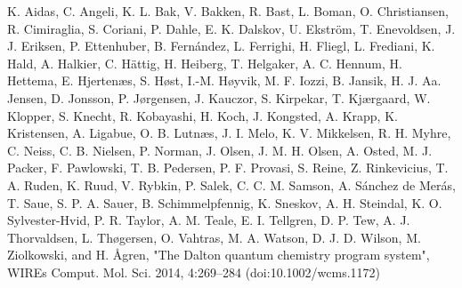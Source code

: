 \documentclass{article}
\begin{document}
\begin{thebibliography}{}
 K. Aidas, C. Angeli, K. L. Bak, V. Bakken, R. Bast, L. Boman, O. Christiansen, R. Cimiraglia, S. Coriani, P. Dahle, E. K. Dalskov, U. Ekström, T. Enevoldsen, J. J. Eriksen, P. Ettenhuber, B. Fernández, L. Ferrighi, H. Fliegl, L. Frediani, K. Hald, A. Halkier, C. Hättig, H. Heiberg, T. Helgaker, A. C. Hennum, H. Hettema, E. Hjertenæs, S. Høst, I.-M. Høyvik, M. F. Iozzi, B. Jansik, H. J. Aa. Jensen, D. Jonsson, P. Jørgensen, J. Kauczor, S. Kirpekar, T. Kjærgaard, W. Klopper, S. Knecht, R. Kobayashi, H. Koch, J. Kongsted, A. Krapp, K. Kristensen, A. Ligabue, O. B. Lutnæs, J. I. Melo, K. V. Mikkelsen, R. H. Myhre, C. Neiss, C. B. Nielsen, P. Norman, J. Olsen, J. M. H. Olsen, A. Osted, M. J. Packer, F. Pawlowski, T. B. Pedersen, P. F. Provasi, S. Reine, Z. Rinkevicius, T. A. Ruden, K. Ruud, V. Rybkin, P. Salek, C. C. M. Samson, A. Sánchez de Merás, T. Saue, S. P. A. Sauer, B. Schimmelpfennig, K. Sneskov, A. H. Steindal, K. O. Sylvester-Hvid, P. R. Taylor, A. M. Teale, E. I. Tellgren, D. P. Tew, A. J. Thorvaldsen, L. Thøgersen, O. Vahtras, M. A. Watson, D. J. D. Wilson, M. Ziolkowski, and H. Ågren, "The Dalton quantum chemistry program system", WIREs Comput. Mol. Sci. 2014, 4:269–284 (doi:10.1002/wcms.1172)

\end{thebibliography}
\end{document}
